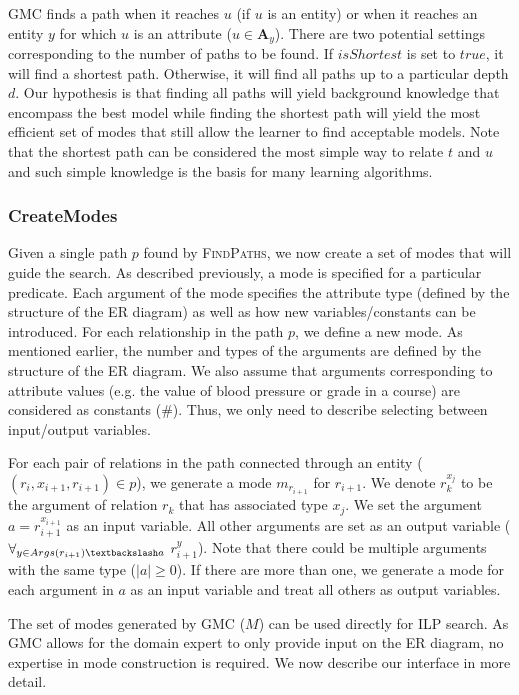 \documentclass[sigconf]{acmart}
\begin{document}
\textsc{GMC} finds a path when it reaches $u$ (if $u$ is an entity) or when it reaches an entity $y$ for which $u$ is an attribute ($u \in \mathbf{A}_y $). There are two potential settings corresponding to the number of paths to be found. If $isShortest$ is set to $true$, it will find a shortest path. Otherwise, it will find all paths up to a particular depth $d$. Our hypothesis is that finding all paths will yield background knowledge that encompass the best model while finding the shortest path will yield the most efficient set of modes that still allow the learner to find acceptable models. Note that the shortest path can be considered the most simple way to relate $t$ and $u$ and such simple knowledge is the basis for many learning algorithms. 

\subsubsection{CreateModes}
Given a single path $p$ found by \textsc{FindPaths}, we now create a set of modes that will guide the search. As described previously, a mode is specified for a particular predicate. Each argument of the mode specifies the attribute type (defined by the structure of the ER diagram) as well as how new variables/constants can be introduced. For each relationship in the path $p$, we define a new mode. As mentioned earlier, the number and types of the arguments are defined by the structure of the ER diagram. We also assume that arguments corresponding to attribute values (e.g. the value of blood pressure or grade in a course) are considered as constants (\#). Thus, we only need to describe selecting between input/output variables. 

For each pair of relations in the path connected through an entity ($(r_i,x_{i+1},r_{i+1})\in p$), we generate a mode $m_{r_{i+1}}$ for $r_{i+1}$. We denote $r^{x_{j}}_{k}$ to be the argument of relation $r_{k}$ that has associated type $x_{j}$. We set the argument $a=r^{x_{i+1}}_{i+1}$ as an input variable. All other arguments are set as an output variable ($\forall_{y\in Args(r_{i+1})\textbackslash a}$ $r^{y}_{i+1}$). Note that there could be multiple arguments with the same type ($|a|\geq 0$). If there are more than one, we generate a mode for each argument in $a$ as an input variable and treat all others as output variables.

The set of modes generated by \textsc{GMC} ($M$) can be used directly for ILP search. As \textsc{GMC} allows for the domain expert to only provide input on the ER diagram, no expertise in mode construction is required. We now describe our interface in more detail. 
\end{document}
